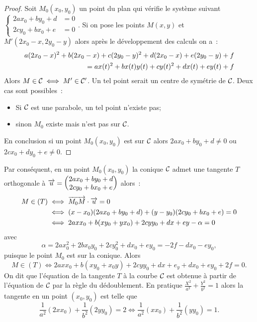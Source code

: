 \begin{proof}
  Soit $M_0(x_0,y_0)$ un point du plan qui vérifie le système suivant $\begin{cases}2ax_0+by_0+d &=0 \\ 2cy_0+bx_0+e &=0\end{cases}$. Si on pose les points $M(x,y)$ et $M'(2x_0-x,2y_0-y)$ alors après le développement des calculs on a~:
  \begin{align}
    a(2x_0-x)^2+b(2x_0-x)+c(2y_0-y)^2+d(2x_0-x)+e(2y_0-y)+f \notag \\
= ax(t)^2+bx(t)y(t)+cy(t)^2+dx(t)+ey(t)+f
  \end{align}
Alors $M \in \mathcal{C}_{{}} \iff M' \in \mathcal{C}_{{}}'$. Un tel point serait un centre de symétrie de $\mathcal{C}_{{}}$. Deux cas sont possibles~:
\begin{itemize}
\item Si $\mathcal{C}_{{}}$ est une parabole, un tel point n'existe pas;
\item sinon $M_0$ existe mais n'est pas sur $\mathcal{C}_{{}}$.
\end{itemize}
En conclusion si un point $M_0(x_0,y_0)$ est sur $\mathcal{C}_{{}}$ alors $2ax_0+by_0+d \neq 0$ ou $2cx_0+dy_0+e \neq 0$.
\end{proof}
Par conséquent, en un point $M_0(x_0,y_0)$ la conique $\mathcal{C}_{{}}$ admet une tangente $T$ orthogonale à $\overrightarrow{u}=\begin{pmatrix} 2ax_0 +by_0 +d \\ 2cy_0+bx_0+e \end{pmatrix}$  alors~:
\begin{align}
M \in (T) &\iff \overrightarrow{M_0 M} \cdot \overrightarrow{u}=0 \\
&\iff (x-x_0)(2ax_0+by_0+d)+(y-y_0)(2cy_0+bx_0+e)=0 \\
&\iff 2axx_0 + b(xy_0+yx_0)+2cyy_0 +dx+ey - \alpha=0
\end{align}
avec
\begin{equation}
\alpha=2ax_0^2+  2bx_0y_0+2cy_0^2+dx_0+ey_0=-2f-dx_0-ey_0,
\end{equation}
puisque le point $M_0$ est sur la conique. Alors
\begin{equation}
  M \in (T) \iff 2axx_0+b(xy_0+x_0y)+2cyy_0+dx+e_y+dx_0+ey_0+2f=0.
\end{equation}
On dit que l'équation de la tangente $T$ à la courbe $\mathcal{C}_{{}}$ est obtenue à partir de l'équation de $\mathcal{C}_{{}}$ par la règle du dédoublement. En pratique $\frac{X^2}{a^2} + \frac{Y^2}{b^2}=1$ alors la tangente en un point $(x_0,y_0)$ est telle que
\begin{equation}
  \frac{1}{a^2}(2xx_0) + \frac{1}{b^2}(2yy_0)=2 \iff \frac{1}{a^2}(xx_0) + \frac{1}{b^2}(yy_0)=1.
\end{equation}

